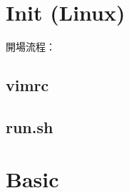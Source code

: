 \documentclass[a4paper,10pt,twocolumn,oneside]{article}
\begin{document}




\section{Init (Linux)}

開場流程：


\subsection{vimrc}


% 

\subsection{run.sh}



%


\section{Basic}

% 
\end{document}
